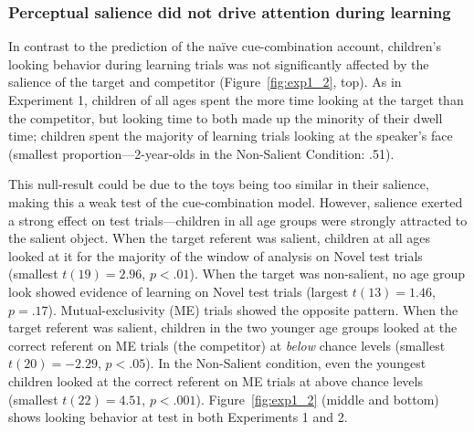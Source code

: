\documentclass[man,floatsintext]{apa6}
\begin{document}
\subsubsection{Perceptual salience did not drive attention during learning} 

In contrast to the prediction of the na\"{i}ve cue-combination account, children's looking behavior during learning trials was not significantly affected by the salience of the target and competitor (Figure~\ref{fig:exp1_2}, top). As in Experiment 1, children of all ages spent the more time looking at the target than the competitor, but looking time to both made up the minority of their dwell time; children spent the majority of learning trials looking at the speaker's face (smallest proportion---2-year-olds in the Non-Salient Condition: .51).

This null-result could be due to the toys being too similar in their salience, making this a weak test of the cue-combination model. However, salience exerted a strong effect on test trials---children in all age groups were strongly attracted to the salient object. When the target referent was salient, children at all ages looked at it for the majority of the window of analysis on Novel test trials (smallest $t(19)  = 2.96$, $p < .01$). When the target was non-salient, no age group look showed evidence of learning on Novel test trials (largest $t(13)  = 1.46$, $p = .17$). Mutual-exclusivity (ME) trials showed the opposite pattern. When the target referent was salient, children in the two younger age groups looked at the correct referent on ME trials (the competitor) at \emph{below} chance levels (smallest $t(20) = -2.29$, $p < .05$). In the Non-Salient condition, even the youngest children looked at the correct referent on ME trials at above chance levels (smallest $t(22) = 4.51$, $p < .001$). Figure~\ref{fig:exp1_2} (middle and bottom) shows looking behavior at test in both Experiments 1 and 2.
\end{document}
